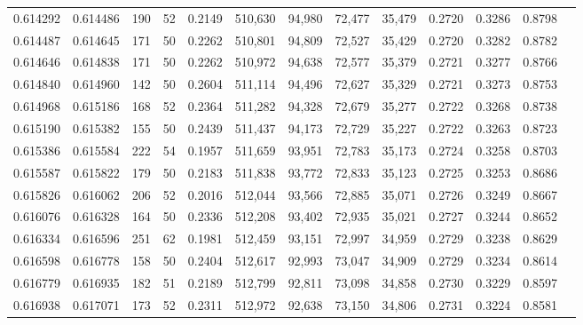 \begin{tabular}{rrrrrrrrrrrrr}
0.614292 & 0.614486 &   190 &  52 &                                     0.2149 & 510,630 &  94,980 &  72,477 &  35,479 & 0.2720 & 0.3286 & 0.8798 \\
0.614487 & 0.614645 &   171 &  50 &                                     0.2262 & 510,801 &  94,809 &  72,527 &  35,429 & 0.2720 & 0.3282 & 0.8782 \\
0.614646 & 0.614838 &   171 &  50 &                                     0.2262 & 510,972 &  94,638 &  72,577 &  35,379 & 0.2721 & 0.3277 & 0.8766 \\
0.614840 & 0.614960 &   142 &  50 &                                     0.2604 & 511,114 &  94,496 &  72,627 &  35,329 & 0.2721 & 0.3273 & 0.8753 \\
0.614968 & 0.615186 &   168 &  52 &                                     0.2364 & 511,282 &  94,328 &  72,679 &  35,277 & 0.2722 & 0.3268 & 0.8738 \\
0.615190 & 0.615382 &   155 &  50 &                                     0.2439 & 511,437 &  94,173 &  72,729 &  35,227 & 0.2722 & 0.3263 & 0.8723 \\
0.615386 & 0.615584 &   222 &  54 &                                     0.1957 & 511,659 &  93,951 &  72,783 &  35,173 & 0.2724 & 0.3258 & 0.8703 \\
0.615587 & 0.615822 &   179 &  50 &                                     0.2183 & 511,838 &  93,772 &  72,833 &  35,123 & 0.2725 & 0.3253 & 0.8686 \\
0.615826 & 0.616062 &   206 &  52 &                                     0.2016 & 512,044 &  93,566 &  72,885 &  35,071 & 0.2726 & 0.3249 & 0.8667 \\
0.616076 & 0.616328 &   164 &  50 &                                     0.2336 & 512,208 &  93,402 &  72,935 &  35,021 & 0.2727 & 0.3244 & 0.8652 \\
0.616334 & 0.616596 &   251 &  62 &                                     0.1981 & 512,459 &  93,151 &  72,997 &  34,959 & 0.2729 & 0.3238 & 0.8629 \\
0.616598 & 0.616778 &   158 &  50 &                                     0.2404 & 512,617 &  92,993 &  73,047 &  34,909 & 0.2729 & 0.3234 & 0.8614 \\
0.616779 & 0.616935 &   182 &  51 &                                     0.2189 & 512,799 &  92,811 &  73,098 &  34,858 & 0.2730 & 0.3229 & 0.8597 \\
0.616938 & 0.617071 &   173 &  52 &                                     0.2311 & 512,972 &  92,638 &  73,150 &  34,806 & 0.2731 & 0.3224 & 0.8581 \\

\end{tabular}
